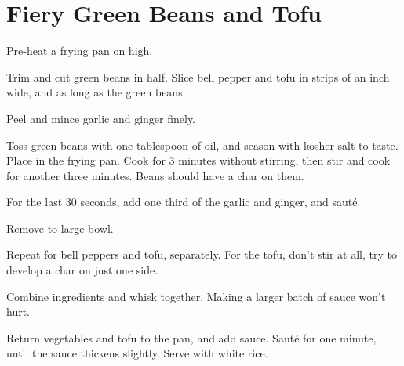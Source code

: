 \section{Fiery Green Beans and Tofu}
\begin{recipe}


Pre-heat a frying pan on high.


Trim and cut green beans in half. Slice bell pepper and tofu in strips
 of an inch wide, and as long as the green beans.


Peel and mince garlic and ginger finely.


Toss green beans with one tablespoon of oil, and season with kosher salt to taste. Place in
the frying pan. Cook for 3 minutes without stirring, then stir and cook for another
three minutes. Beans should have a char on them.

For the last 30 seconds, add one third of the garlic and ginger, and sauté.

Remove to large bowl.

Repeat for bell peppers and tofu, separately. For the tofu, don't stir at all,
try to develop a char on just one side.


Combine ingredients and whisk together. Making a larger batch of sauce won't hurt.

Return vegetables and tofu to the pan, and add sauce. Sauté for one minute,
until the sauce thickens slightly. Serve with white rice.

\end{recipe}
